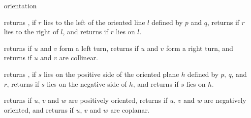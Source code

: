 \begin{ccRefFunction}{orientation}

\ccHtmlNoLinks
{}
{returns , if $r$ lies to the left of the oriented 
line $l$ defined by $p$ and $q$, returns  if $r$ 
lies to the right of $l$, and returns  if $r$ lies
on $l$.}

\ccHtmlNoLinks
{}
{returns  if $u$ and $v$ form a left turn,
returns  if $u$ and $v$ form a right turn,
and returns  if $u$ and $v$ are collinear.}


\ccHtmlNoLinks
{}
{returns , if $s$ lies on the positive side of the oriented 
plane $h$ defined by $p$, $q$, and $r$, returns  if $s$ 
lies on the negative side of $h$, and returns  if $s$ lies
on $h$.}

\ccHtmlNoLinks
{}
{returns  if $u$, $v$ and $w$ are positively oriented,
returns  if $u$, $v$ and $w$ are negatively oriented,
and returns  if $u$, $v$ and $w$ are coplanar.}


\ccSeeAlso
{}\\
\\

\end{ccRefFunction}
